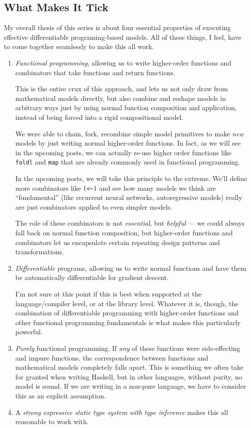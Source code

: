 \documentclass[]{article}
\begin{document}
\subsection{What Makes It Tick}\label{what-makes-it-tick}

My overall thesis of this series is about four essential properties of executing
effective differentiable programing-based models. All of these things, I feel,
have to come together seamlessly to make this all work.

\begin{enumerate}
\def\labelenumi{\arabic{enumi}.}
\item
  \emph{Functional programming}, allowing us to write higher-order functions and
  combinators that take functions and return functions.

  This is the entire crux of this approach, and lets us not only draw from
  mathematical models directly, but also combine and reshape models in arbitrary
  ways just by using normal function composition and application, instead of
  being forced into a rigid compositional model.

  We were able to chain, fork, recombine simple model primitives to make
  \emph{new} models by just writing normal higher-order functions. In fact, as
  we will see in the upcoming posts, we can actually re-use higher order
  functions like \texttt{foldl} and \texttt{map} that are already commonly used
  in functional programming.

  In the upcoming posts, we will take this principle to the extreme. We'll
  define more combinators like \texttt{(\textless{}\textasciitilde{})} and see
  how many models we think are ``fundamental'' (like recurrent neural networks,
  autoregressive models) really are just combinators applied to even simpler
  models.

  The role of these combinators is not \emph{essential}, but \emph{helpful} ---
  we could always fall back on normal function composition, but higher-order
  functions and combinators let us encapsulate certain repeating design patterns
  and transformations.
\item
  \emph{Differentiable} programs, allowing us to write normal functions and have
  them be automatically differentiable for gradient descent.

  I'm not sure at this point if this is best when supported at the
  language/compiler level, or at the library level. Whatever it is, though, the
  combination of differentiable programming with higher-order functions and
  other functional programming fundamentals is what makes this particularly
  powerful.
\item
  \emph{Purely} functional programming. If \emph{any} of these functions were
  side-effecting and impure functions, the correspondence between functions and
  mathematical models completely falls apart. This is something we often take
  for granted when writing Haskell, but in other languages, without purity, no
  model is sound. If we are writing in a non-pure language, we have to consider
  this as an explicit assumption.
\item
  A \emph{strong expressive static type system with type inference} makes this
  all reasonable to work with.


\end{enumerate}
\end{document}
